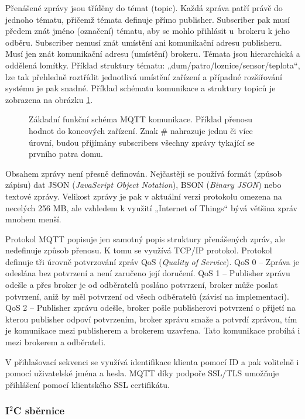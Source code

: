 Přenášené zprávy jsou tříděny do témat (topic). Každá zpráva patří právě do jednoho tématu, přičemž témata definuje přímo publisher. Subscriber pak musí předem znát jméno (označení) tématu, aby se mohlo přihlásit u~brokeru k jeho odběru. Subscriber nemusí znát umístění ani komunikační adresu publisheru. Musí jen znát komunikační adresu (umístění) brokeru. Témata jsou hierarchická a oddělená lomítky. Příklad struktury tématu: „dum/patro/loznice/sensor/teplota“, lze tak přehledně roztřídit jednotlivá umístění zařízení a případné rozšiřování systému je pak snadné. Příklad schématu komunikace a struktury topiců je zobrazena na obrázku \ref{fig:mqtt-protokol}.

\begin{figure}[H]
    \centering
    \def\svgwidth{\columnwidth}
    
    \caption{Základní funkční schéma MQTT komunikace. Příklad přenosu hodnot do koncových zařízení. Znak \# nahrazuje jednu či více úrovní, budou přijímány subscribers  všechny zprávy tykající se prvního patra domu.}
    \label{fig:mqtt-protokol}
\end{figure}

Obsahem zprávy není přesně definován. Nejčastěji se používá formát (způsob zápisu) dat JSON (\textit{JavaScript Object Notation}), BSON (\textit{Binary JSON}) nebo textové zprávy. Velikost zprávy je pak v aktuální verzi protokolu omezena na necelých 256 MB, ale vzhledem k využití „Internet of Things“ bývá většina zpráv mnohem menší.

Protokol MQTT popisuje jen samotný popis struktury přenášených zpráv, ale nedefinuje způsob přenosu. K tomu se využívá TCP/IP protokol. Protokol definuje tři úrovně potvrzování zpráv QoS (\textit{Quality of Service}). QoS 0 – Zpráva je odeslána bez potvrzení a není zaručeno její doručení. QoS 1 – Publisher zprávu odešle a přes broker je od odběratelů posláno potvrzení, broker může poslat potvrzení, aniž by měl potvrzení od všech odběratelů (závisí na implementaci). QoS 2 – Publisher zprávu odešle, broker pošle publisherovi potvrzení o přijetí na kterou publisher odpoví potvrzením, broker zprávu smaže a potvrdí zprávou, tím je komunikace mezi publisherem a brokerem uzavřena. Tato komunikace probíhá i mezi brokerem a odběrateli.


V přihlašovací sekvenci se využívá identifikace klienta pomocí ID a pak volitelně i pomocí uživatelské jména a hesla. MQTT díky podpoře SSL/TLS umožňuje přihlášení pomocí klientského SSL certifikátu.
\subsubsection{I$^2$C sběrnice}
